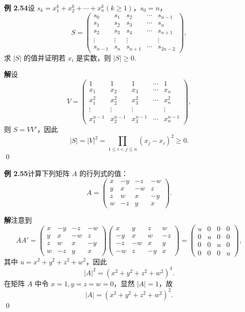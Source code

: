 \documentclass[UTF8,12pt,a4paper,fontset=fandol]{ctexart}
\begin{document}
\noindent\textbf{例 2.54}\quad 设 $s_k=x_1^k+x_2^k+\cdots+x_n^k(k\ge1)$，$s_0=n$，
\[
S=
\left(
\begin{array}{ccccc}
s_0 & s_1 & s_2 & \cdots & s_{n-1}\\
s_1 & s_2 & s_3 & \cdots & s_n\\
s_2 & s_3 & s_4 & \cdots & s_{n+1}\\
\vdots & \vdots & \vdots & & \vdots\\
s_{n-1} & s_n & s_{n+1} & \cdots & s_{2n-2}
\end{array}
\right),
\]
求 $|S|$ 的值并证明若 $x_i$ 是实数，则 $|S|\ge0$.

\noindent\textbf{解}\quad 设
\[
V=
\left(
\begin{array}{ccccc}
1 & 1 & 1 & \cdots & 1\\
x_1 & x_2 & x_3 & \cdots & x_n\\
x_1^2 & x_2^2 & x_3^2 & \cdots & x_n^2\\
\vdots & \vdots & \vdots & & \vdots\\
x_1^{n-1} & x_2^{n-1} & x_3^{n-1} & \cdots & x_n^{n-1}
\end{array}
\right),
\]
则 $S=VV'$，因此
\[
|S|=|V|^2=\prod_{1\le i<j\le n}(x_j-x_i)^2\ge0.
\]
\qed

\noindent\textbf{例 2.55}\quad 计算下列矩阵 $A$ 的行列式的值：
\[
A=
\left(
\begin{array}{rrrr}
x & -y & -z & -w\\
y & x & -w & z\\
z & w & x & -y\\
w & -z & y & x
\end{array}
\right).
\]

\noindent\textbf{解}\quad 注意到
\[
AA'=
\left(
\begin{array}{rrrr}
x & -y & -z & -w\\
y & x & -w & z\\
z & w & x & -y\\
w & -z & y & x
\end{array}
\right)
\left(
\begin{array}{rrrr}
x & y & z & w\\
-y & x & w & -z\\
-z & -w & x & y\\
-w & z & -y & x
\end{array}
\right)
=
\left(
\begin{array}{cccc}
u & 0 & 0 & 0\\
0 & u & 0 & 0\\
0 & 0 & u & 0\\
0 & 0 & 0 & u
\end{array}
\right),
\]
其中 $u=x^2+y^2+z^2+w^2$，因此
\[
|A|^2=(x^2+y^2+z^2+w^2)^4.
\]
在矩阵 $A$ 中令 $x=1,y=z=w=0$，显然 $|A|=1$，故
\[
|A|=(x^2+y^2+z^2+w^2)^2.
\]
\qed
\end{document}
